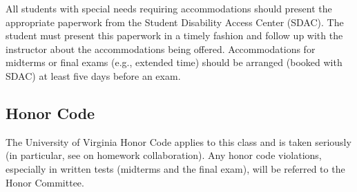 \documentclass[oneside,11pt]{amsart}
\begin{document}
All students with special needs requiring accommodations should present the appropriate paperwork from the Student Disability Access Center (SDAC). The student must present this paperwork in a timely fashion and follow up with the instructor about the accommodations being offered.  Accommodations for midterms or final exams (e.g., extended time) should be arranged (booked with SDAC) at least five days before an exam.

\subsection{Honor Code} 

The University of Virginia Honor Code applies to this class and is taken seriously (in particular, see  on homework collaboration).  Any honor code violations, especially in written tests (midterms and the final exam), will be referred to the Honor Committee.
\end{document}
